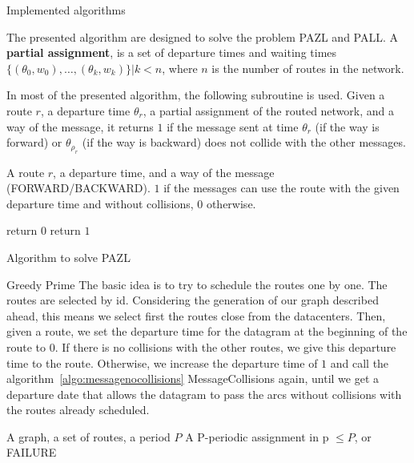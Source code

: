 \documentclass[10pt]{article}
\begin{document}
  \begin{section}{Implemented algorithms}
  
 

  The presented algorithm are designed to solve the problem PAZL and PALL.
  A \textbf{partial assignment}, is a set of departure times and waiting times $\{(\theta_0,w_0),\ldots,(\theta_k,w_k)\}|k<n$, where $n$ is the number of routes in the network.
  
   
   
  In most of the presented algorithm, the following subroutine is used. Given a route $r$, a departure time $\theta_r$, a partial assignment of the routed network, and a way of the message, it returns $1$ if the message sent at time $\theta_r$ (if the way is forward) or $\theta_{\rho_r}$ (if the way is backward)  does not collide with the other messages. 
   	\begin{algorithm}[H]
 	\caption{MessageNoCollisions}
	\label{algo:messagenocollisions}
 	\begin{algorithmic}
 	\REQUIRE A route $r$, a departure time, and a way of the message (FORWARD/BACKWARD).
	\ENSURE $1$ if the messages can use the route with the given departure time and without collisions, $0$ otherwise.

 	\STATE return $0$
 	\ENDIF
 	\ENDFOR
	\STATE return $1$
 	\end{algorithmic}
 	\end{algorithm}
 	
  \begin{subsection}{Algorithm to solve PAZL }

  

   
  \begin{subsubsection}{Greedy Prime}
  The basic idea is to try to schedule the routes one by one. The routes are selected by id. Considering the generation of our graph described ahead, this means we select first the routes close from the datacenters.  Then, given a route, we set the departure time for the datagram at the beginning of the route to $0$. If there is no collisions with the other routes, we give this departure time to the route. Otherwise, we increase the departure time of $1$ and call the algorithm~\ref{algo:messagenocollisions} MessageCollisions again, until we get a departure date that allows the datagram to pass the arcs without collisions with the routes already scheduled.

   	\begin{algorithm}[H]
 	\caption{Greedy Prime}
	\label{algo:greedyprime}
 	\begin{algorithmic}
 	\REQUIRE A graph, a set of routes, a period $P$
	\ENSURE A P-periodic assignment in p $\leq P$, or FAILURE


\end{algorithmic}
\end{algorithm}
\end{subsubsection}
\end{subsection}
\end{section}
\end{document}

